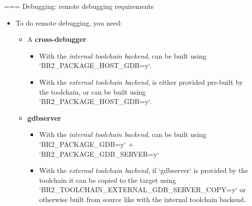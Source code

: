 === {Debugging: remote debugging requirements}
  \begin{itemize}
  \item To do remote debugging, you need:
    \begin{itemize}
    \item A {\bf cross-debugger}
      \begin{itemize}
      \item With the {\em internal toolchain backend}, can be built
        using `BR2_PACKAGE_HOST_GDB=y`.
      \item With the {\em external toolchain backend}, is either
        provided pre-built by the toolchain, or can be built using
        `BR2_PACKAGE_HOST_GDB=y`.
      \end{itemize}
    \item {\bf gdbserver}
      \begin{itemize}
      \item With the {\em internal toolchain backend}, can be built
        using `BR2_PACKAGE_GDB=y` + `BR2_PACKAGE_GDB_SERVER=y`
      \item With the {\em external toolchain backend}, if
        `gdbserver` is provided by the toolchain it can be copied
        to the target using
        `BR2_TOOLCHAIN_EXTERNAL_GDB_SERVER_COPY=y` or otherwise
        built from source like with the internal toolchain backend.
      \end{itemize}
    \end{itemize}
  \end{itemize}


